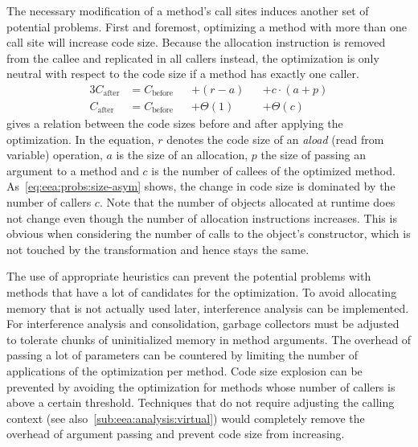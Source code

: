 		The necessary modification of a method's call sites induces another set of potential problems. First and foremost,
		optimizing a method with more than one call site will increase code size. Because the allocation instruction is
		removed from the callee and replicated in all callers instead, the optimization is only neutral with respect to the
		code size if a method has exactly one caller.
		\begin{alignat}{3}
			C_\text{after}
				&= C_\text{before} &&+ (r - a)   &&+ c \cdot (a + p) \label{eq:eea:probs:size}\\
			C_\text{after}
				&= C_\text{before} &&+ \Theta(1) &&+ \Theta(c) \label{eq:eea:probs:size-asym}
		\end{alignat}
		 gives a relation between the code sizes before and after applying the optimization. In the
		equation, $r$ denotes the code size of an \emph{aload} (read from variable) operation, $a$ is the size of an
		allocation, $p$ the size of passing an argument to a method and $c$ is the number of callees of the optimized
		method. As~\cref{eq:eea:probs:size-asym} shows, the change in code size is dominated by the number of callers $c$.
		Note that the number of objects allocated at runtime does not change even though the number of allocation
		instructions increases. This is obvious when considering the number of calls to the object's constructor, which is
		not touched by the transformation and hence stays the same.

		The use of appropriate heuristics can prevent the potential problems with methods that have a lot of candidates for
		the optimization. To avoid allocating memory that is not actually used later, interference analysis can be
		implemented. For interference analysis and consolidation, garbage collectors must be adjusted to tolerate chunks of
		uninitialized memory in method arguments. The overhead of passing a lot of parameters can be countered by limiting
		the number of applications of the optimization per method. Code size explosion can be prevented by avoiding the
		optimization for methods whose number of callers is above a certain threshold. Techniques that do not require
		adjusting the calling context (see also~\cref{sub:eea:analysis:virtual}) would completely remove the overhead of
		argument passing and prevent code size from increasing.


